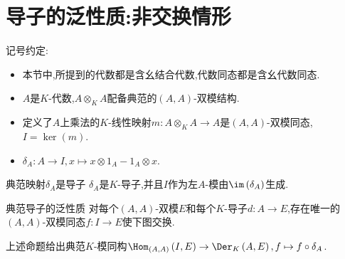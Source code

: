 \section{导子的泛性质:非交换情形}


记号约定:
\begin{itemize}
	\item 本节中,所提到的代数都是含幺结合代数,代数同态都是含幺代数同态.
	\item $A$是$K$-代数,$A\otimes_{K}A$配备典范的$\left(A,A\right)$-双模结构.
	\item 定义了$A$上乘法的$K$-线性映射$m:A\otimes_{K}A\to A$是$\left(A,A\right)$-双模同态,$I=\ker\left(m\right)$.
	\item $\delta_{A}:A\to I,x\mapsto x\otimes 1_{A}-1_{A}\otimes x$.
\end{itemize}

\begin{lemma}{典范映射$\delta_{A}$是导子}{}
	$\delta_{A}$是$K$-导子,并且$I$作为左$A$-模由$\im\left(\delta_{A}\right)$生成.
\end{lemma}

\begin{proposition}{典范导子的泛性质}{}
	对每个$\left(A,A\right)$-双模$E$和每个$K$-导子$d:A\to E$,存在唯一的$\left(A,A\right)$-双模同态$f:I\to E$使下图交换.
	\begin{center}
	\end{center}
\end{proposition}

\begin{remark}{}{}
	上述命题给出典范$K$-模同构$\Hom_{\left(A,A\right)}\left(I,E\right)\to \Der_{K}\left(A,E\right),f\mapsto f\circ\delta_{A}$.
\end{remark}